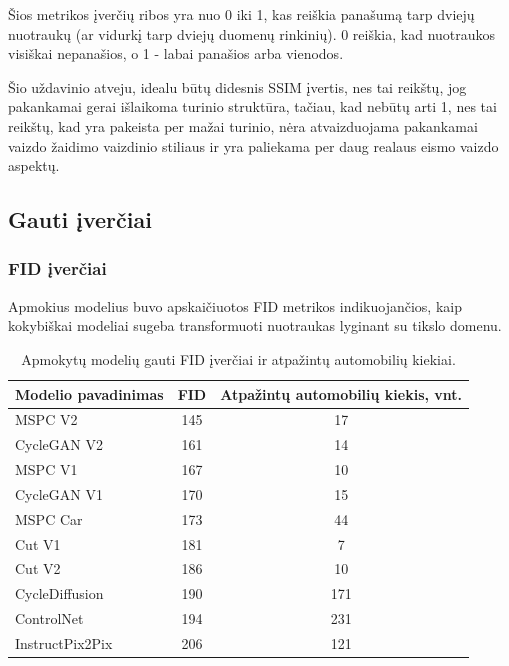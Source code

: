 \documentclass{VUMIFPSbakalaurinis}
\begin{document}
            Šios metrikos įverčių ribos yra nuo 0 iki 1, kas reiškia panašumą tarp dviejų nuotraukų (ar vidurkį tarp dviejų duomenų rinkinių). 0 reiškia, kad nuotraukos visiškai nepanašios, o 1 - labai panašios arba vienodos.

            Šio uždavinio atveju, idealu būtų didesnis SSIM įvertis, nes tai reikštų, jog pakankamai gerai išlaikoma turinio struktūra, tačiau, kad nebūtų arti 1, nes tai reikštų, kad yra pakeista per mažai turinio, nėra atvaizduojama pakankamai vaizdo žaidimo vaizdinio stiliaus ir yra paliekama per daug realaus eismo vaizdo aspektų. 
        
   
    

    \subsection{Gauti įverčiai}
        \subsubsection{FID įverčiai}
            Apmokius modelius buvo apskaičiuotos FID metrikos indikuojančios, kaip kokybiškai modeliai sugeba transformuoti nuotraukas lyginant su tikslo domenu.
            \begin{table}[H]
                \footnotesize
                \centering
                \caption{Apmokytų modelių gauti FID įverčiai ir atpažintų automobilių kiekiai.}
                {\begin{tabular}{|l|c|c|} \hline
                    Modelio pavadinimas & FID & Atpažintų automobilių kiekis, vnt.\\
                    \hline
                    MSPC V2 & 145 & 17\\
                    CycleGAN V2 & 161 & 14\\
                    MSPC V1 & 167 & 10\\
                    CycleGAN V1 & 170 & 15\\
                    MSPC Car & 173 & 44\\ %
                    Cut V1 & 181 & 7\\
                    Cut V2 & 186 & 10\\ 
                    CycleDiffusion & 190 & 171 \\ %
                    ControlNet & 194 & 231 \\ %
                    InstructPix2Pix & 206 & 121 \\ %
                    \hline
                    \end{tabular}
                }
                \label{tab:table example}
            \end{table}
    
\end{document}
